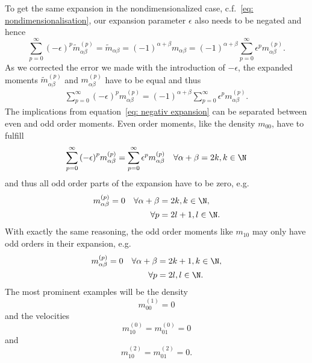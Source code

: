 To get the same expansion in the nondimensionalized case, c.f.~\eqref{eq: nondimensionalisation}, our expansion parameter $\epsilon$ also needs to be negated and hence
\begin{equation}
     \sum_{p=0}^{\infty} {(-\epsilon)}^p \tilde{m}_{\alpha\beta}^{(p)}
     = \tilde{m}_{\alpha\beta}
     = {(-1)}^{\alpha + \beta}  m_{\alpha\beta}
     = {(-1)}^{\alpha + \beta} \sum_{p=0}^{\infty} \epsilon^p m_{\alpha\beta}^{(p)}.
\end{equation}
As we corrected the error we made with the introduction of $-\epsilon$, the expanded moments $\tilde{m}_{\alpha\beta}^{(p)}$ and $m_{\alpha\beta}^{(p)}$ have to be equal and thus
\begin{align}
  \label{eq: negativ expansion}
  \sum_{p=0}^{\infty} {(-\epsilon)}^p m_{\alpha\beta}^{(p)}
  = {(-1)}^{\alpha + \beta} \sum_{p=0}^{\infty} \epsilon^p m_{\alpha\beta}^{(p)}.
\end{align}
The implications from equation~\eqref{eq: negativ expansion} can be separated between even and odd order moments.
Even order moments, like the density $m_{00}$, have to fulfill
\begin{align}
  \label{eq: negativ expansion even}
  \sum_{p=0}^{\infty} {(-\epsilon)}^p m_{\alpha\beta}^{(p)}
  = \sum_{p=0}^{\infty} \epsilon^p m_{\alpha\beta}^{(p)} \quad \forall \alpha+\beta=2k, k\in\N
\end{align}
and thus all odd order parts of the expansion have to be zero, e.g.
\begin{equation}
  \label{eq: kill even moments odd order}
  \begin{aligned}
    m_{\alpha\beta}^{(p)} = 0 \quad
    \forall\alpha+\beta & = 2k, k\in\N, \\
    \forall p & = 2l+1, l\in\N.
  \end{aligned}
\end{equation}
With exactly the same reasoning, the odd order moments like $m_{10}$ may only have odd orders in their expansion, e.g.
\begin{equation}
  \label{eq: kill odd moments even order}
  \begin{aligned}
    m_{\alpha\beta}^{(p)} = 0 \quad
    \forall\alpha+\beta & = 2k+1, k\in\N, \\
    \forall p & = 2l, l\in\N.
  \end{aligned}
\end{equation}
The most prominent examples will be the density
\begin{equation}
  \label{eq: first order pressure zero}
  m_{00}^{(1)}=0
\end{equation}
and the velocities
\begin{equation}
  \label{eq: zeroth order velocity zero}
  m_{10}^{(0)} = m_{01}^{(0)} = 0
\end{equation}
and
\begin{equation}
  \label{eq: second order velocity zero}
  m_{10}^{(2)} = m_{01}^{(2)} = 0.
\end{equation}
